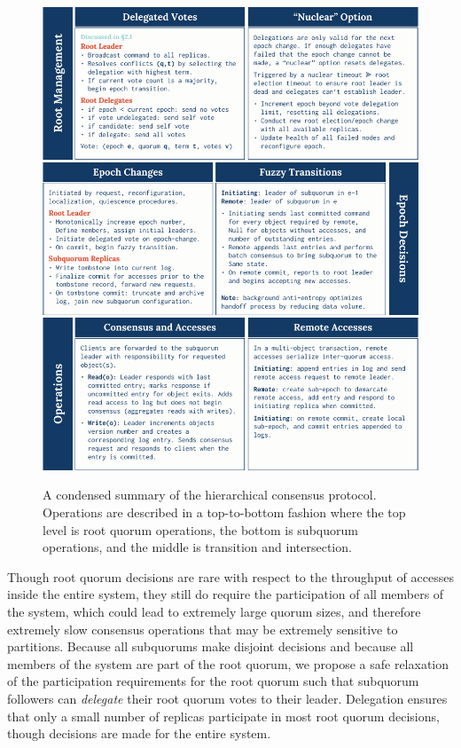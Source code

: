\begin{figure}
    \begin{center}
        \includegraphics[width=5in]{figures/ch03_hc_operation_summary.pdf}
    \end{center}
    \renewcommand{\baselinestretch}{1}
    \small\normalsize

    \begin{quote}
        \caption[HC Operational Summary]{A condensed summary of the hierarchical consensus protocol. Operations are described in a top-to-bottom fashion where the top level is root quorum operations, the bottom is subquorum operations, and the middle is transition and intersection.}
        \label{fig:ch03_hc_operation_summary}
    \end{quote}
\end{figure}
\renewcommand{\baselinestretch}{2}
\small\normalsize

Though root quorum decisions are rare with respect to the throughput of accesses inside the entire system, they still do require the participation of all members of the system, which could lead to extremely large quorum sizes, and therefore extremely slow consensus operations that may be extremely sensitive to partitions.
Because all subquorums make disjoint decisions and because all members of the system are part of the root quorum, we propose a safe relaxation of the participation requirements for the root quorum such that subquorum followers can \emph{delegate} their root quorum votes to their leader.
Delegation ensures that only a small number of replicas participate in most root quorum decisions, though decisions are made for the entire system.

